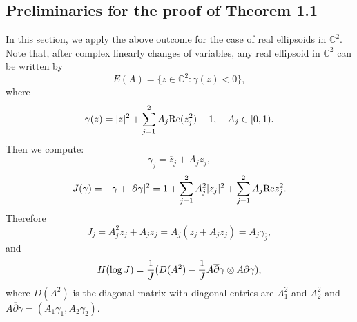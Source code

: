 \documentclass[12pt]{amsart}
\def\d{\partial}
\def\CC{\mathbb{C}}
\def\jbar{\overline{j}}
\def\zbar{\overline{z}}
\def\dbar{\overline{\partial}}
\def\d{\partial}
\begin{document}
\subsection{Preliminaries for the proof of Theorem 1.1}
In this section, we apply the above outcome for the case of real ellipsoids in $\CC^{2}$. Note that, after complex linearly changes of variables, any
real ellipsoid   in $\mathbb{C}^2$ can be written by
\begin{equation}
E(A)=\{z\in \CC^2: \gamma(z)<0\},
\end{equation}
where
\begin{equation}
\gamma (z)=|z|^2+\sum_{j=1}^2A_j \hbox{Re}( z_j^2)-1,\quad A_j \in [0, 1).
\end{equation}
Then we compute:
$$
\gamma_j=\zbar_j+A_j z_j,
$$
$$
J(\gamma)=-\gamma+ |\d \gamma|^2 =1+\sum_{j=1}^2A_j^2 |z_j|^2+\sum_{j=1}^2 A_j \hbox{Re}  z_j^2.
$$
Therefore 
$$
J_j=A_j^2 \zbar_j+A_j z_j=A_j (z_j+A_j \zbar_j)=A_j \gamma_{\jbar},
$$
and
$$
H(\log J)={1\over J} (D(A^2)-{1\over J} A\dbar \gamma \otimes A\d \gamma),
$$
where
$D(A^2)$ is the diagonal matrix with diagonal entries are $A_1^2$ and $A_2^2$ and $A\dbar \gamma=(A_1\gamma_{\bar1}, A_2 \gamma_{\bar2})$. 
\medskip
\end{document}
